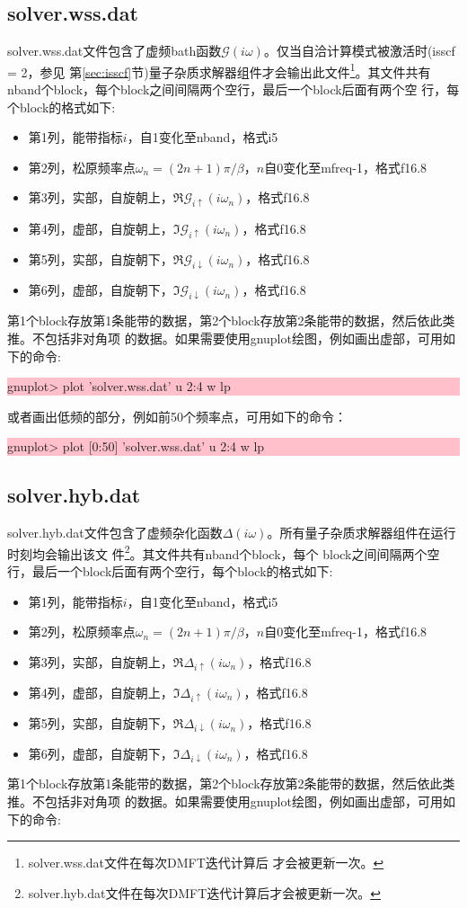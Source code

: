 \subsection{solver.wss.dat}
solver.wss.dat文件包含了虚频bath函数$\mathcal{G}(i\omega)$。仅当自洽计算模式被激活时(isscf = 2，参见
第\ref{sec:isscf}节)量子杂质求解器组件才会输出此文件\footnote{solver.wss.dat文件在每次DMFT迭代计算后
才会被更新一次。}。其文件共有nband个block，每个block之间间隔两个空行，最后一个block后面有两个空
行，每个block的格式如下:
\begin{itemize}
\item 第1列，能带指标$i$，自1变化至nband，格式i5
\item 第2列，松原频率点$\omega_{n}=(2n+1)\pi/\beta$，$n$自0变化至mfreq-1，格式f16.8
\item 第3列，实部，自旋朝上，$\Re \mathcal{G}_{i\uparrow}(i\omega_{n})$，格式f16.8
\item 第4列，虚部，自旋朝上，$\Im \mathcal{G}_{i\uparrow}(i\omega_{n})$，格式f16.8
\item 第5列，实部，自旋朝下，$\Re \mathcal{G}_{i\downarrow}(i\omega_{n})$，格式f16.8
\item 第6列，虚部，自旋朝下，$\Im \mathcal{G}_{i\downarrow}(i\omega_{n})$，格式f16.8
\end{itemize}
第1个block存放第1条能带的数据，第2个block存放第2条能带的数据，然后依此类推。不包括非对角项
的数据。如果需要使用gnuplot绘图，例如画出虚部，可用如下的命令:

\noindent\colorbox{pink}{\parbox[r]{\linewidth}{\quad gnuplot> plot 'solver.wss.dat' u 2:4 w lp }}
或者画出低频的部分，例如前50个频率点，可用如下的命令：

\noindent\colorbox{pink}{\parbox[r]{\linewidth}{\quad gnuplot> plot [0:50] 'solver.wss.dat' u 2:4 w lp }}

\subsection{solver.hyb.dat}
solver.hyb.dat文件包含了虚频杂化函数$\Delta(i\omega)$。所有量子杂质求解器组件在运行时刻均会输出该文
件\footnote{solver.hyb.dat文件在每次DMFT迭代计算后才会被更新一次。}。其文件共有nband个block，每个
block之间间隔两个空行，最后一个block后面有两个空行，每个block的格式如下:
\begin{itemize}
\item 第1列，能带指标$i$，自1变化至nband，格式i5
\item 第2列，松原频率点$\omega_{n}=(2n+1)\pi/\beta$，$n$自0变化至mfreq-1，格式f16.8
\item 第3列，实部，自旋朝上，$\Re \Delta_{i\uparrow}(i\omega_{n})$，格式f16.8
\item 第4列，虚部，自旋朝上，$\Im \Delta_{i\uparrow}(i\omega_{n})$，格式f16.8
\item 第5列，实部，自旋朝下，$\Re \Delta_{i\downarrow}(i\omega_{n})$，格式f16.8
\item 第6列，虚部，自旋朝下，$\Im \Delta_{i\downarrow}(i\omega_{n})$，格式f16.8
\end{itemize}
第1个block存放第1条能带的数据，第2个block存放第2条能带的数据，然后依此类推。不包括非对角项
的数据。如果需要使用gnuplot绘图，例如画出虚部，可用如下的命令:

